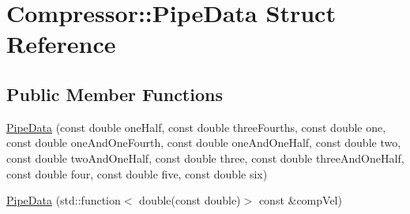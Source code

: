 \hypertarget{struct_compressor_1_1_pipe_data}{}\section{Compressor\+:\+:Pipe\+Data Struct Reference}
\label{struct_compressor_1_1_pipe_data}
\subsection*{Public Member Functions}
\begin{DoxyCompactItemize}
\item 
\hyperlink{struct_compressor_1_1_pipe_data_a71acdc81e25bd90b51361bf8d4f0ed38}{Pipe\+Data} (const double one\+Half, const double three\+Fourths, const double one, const double one\+And\+One\+Fourth, const double one\+And\+One\+Half, const double two, const double two\+And\+One\+Half, const double three, const double three\+And\+One\+Half, const double four, const double five, const double six)
\item 
\hyperlink{struct_compressor_1_1_pipe_data_af7998fd533340b0a84e78fcda91b4806}{Pipe\+Data} (std\+::function$<$ double(const double)$>$ const \&comp\+Vel)
\end{DoxyCompactItemize}

